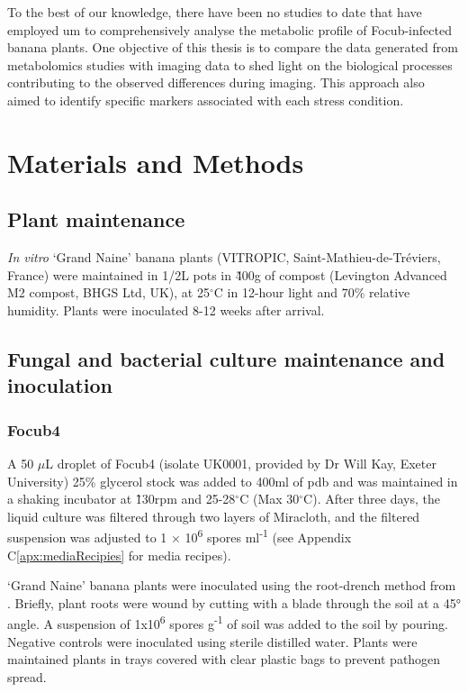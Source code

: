 To the best of our knowledge, there have been no studies to date that have employed \ac{um} to comprehensively analyse the metabolic profile of \ac{Focub}-infected banana plants. One objective of this thesis is to compare the data generated from metabolomics studies with imaging data to shed light on the biological processes contributing to the observed differences during imaging. This approach also aimed to identify specific markers associated with each stress condition. 

\newpage
\section{Materials and Methods}
\label{sec:Chapter4_MM}

\subsection{Plant maintenance}
\textit{In vitro} ‘Grand Naine’ banana plants (VITROPIC, Saint-Mathieu-de-Tréviers, France) were maintained in 1/2L pots in \~ 400g of compost (Levington Advanced M2 compost, BHGS Ltd, UK), at 25$^{\circ}$C in 12-hour light and 70\% relative humidity. Plants were inoculated 8-12 weeks after arrival. 

\subsection{Fungal and bacterial culture maintenance and inoculation}

\subsubsection{\acl{Focub4}}
A 50 \(\mu\)L droplet of \acl{Focub4} (isolate UK0001, provided by Dr Will Kay, Exeter University) 25\% glycerol stock  was added to 400ml of \acf{pdb} and was maintained in a shaking incubator at \~ 130rpm and 25-28$^{\circ}$C (Max 30$^{\circ}$C). After three days, the liquid culture was filtered through two layers of Miracloth, and the filtered suspension was adjusted to 1 × 10\textsuperscript{6} spores ml\textsuperscript{-1} (see Appendix C\ref{apx:mediaRecipies} for media recipes).

‘Grand Naine’ banana plants were inoculated using the root-drench method from \textcite{Garcia-Bastidas2019}. Briefly, plant roots were wound by cutting with a blade through the soil at a 45° angle. A suspension of 1x10\textsuperscript{6} spores g\textsuperscript{-1} of soil was added to the soil by pouring. Negative controls were inoculated using sterile distilled water. Plants were maintained plants in trays covered with clear plastic bags to prevent pathogen spread. 

